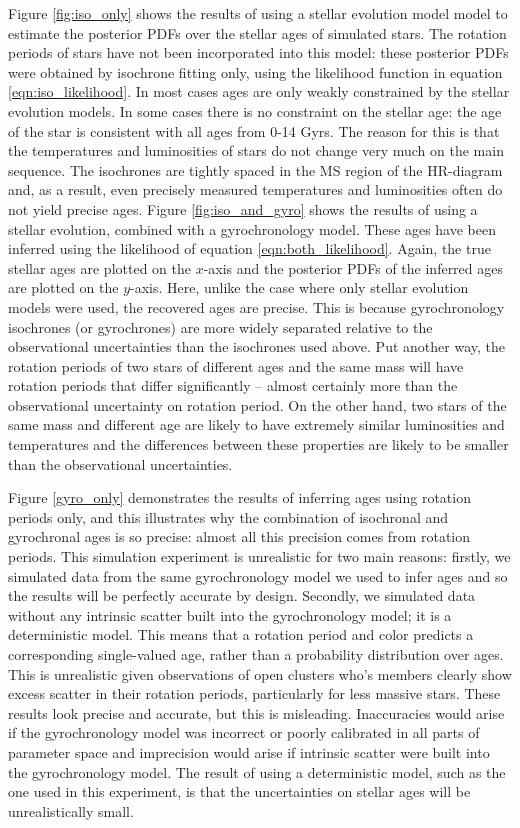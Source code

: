 Figure \ref{fig:iso_only} shows the results of using a
stellar evolution model model to estimate the posterior PDFs over the stellar
ages of simulated stars.
The rotation periods of stars have not been incorporated into this model:
these posterior PDFs were obtained by isochrone fitting only, using the
likelihood function in equation \ref{eqn:iso_likelihood}.
In most cases ages are only weakly constrained by the stellar evolution
models.
In some cases there is no constraint on the stellar age: the age of the star
is consistent with all ages from 0-14 Gyrs.
The reason for this is that the temperatures and luminosities of stars do not
change very much on the main sequence.
The isochrones are tightly spaced in the MS region of the HR-diagram and, as a
result, even precisely measured temperatures and luminosities often do not
yield precise ages.
Figure \ref{fig:iso_and_gyro} shows the results of using a stellar evolution,
combined with a gyrochronology model.
These ages have been inferred using the likelihood of equation
\ref{eqn:both_likelihood}.
Again, the true stellar ages are plotted on the $x$-axis and the posterior
PDFs of the inferred ages are plotted on the $y$-axis.
Here, unlike the case where only stellar evolution models were used, the
recovered ages are precise.
This is because gyrochronology isochrones (or gyrochrones) are more widely
separated relative to the observational uncertainties than the isochrones used
above.
Put another way, the rotation periods of two stars of different ages and the
same mass will have rotation periods that differ significantly -- almost
certainly more than the observational uncertainty on rotation period.
On the other hand, two stars of the same mass and different age are likely to
have extremely similar luminosities and temperatures and the differences
between these properties are likely to be smaller than the observational
uncertainties.

Figure \ref{gyro_only} demonstrates the results of inferring ages using
rotation periods only, and this illustrates why the combination of isochronal
and gyrochronal ages is so precise: almost all this precision comes from
rotation periods.
This simulation experiment is unrealistic for two main reasons: firstly, we
simulated data from the same gyrochronology model we used to infer ages and so
the results will be perfectly accurate by design.
Secondly, we simulated data without any intrinsic scatter built into the
gyrochronology model; it is a deterministic model.
This means that a rotation period and color predicts a corresponding
single-valued age, rather than a probability distribution over ages.
This is unrealistic given observations of open clusters who's members clearly
show excess scatter in their rotation periods, particularly for less massive
stars.
These results look precise and accurate, but this is misleading.
Inaccuracies would arise if the gyrochronology model was incorrect or poorly
calibrated in all parts of parameter space and imprecision would arise if
intrinsic scatter were built into the gyrochronology model.
The result of using a deterministic model, such as the one used in this
experiment, is that the uncertainties on stellar ages will be unrealistically
small.

